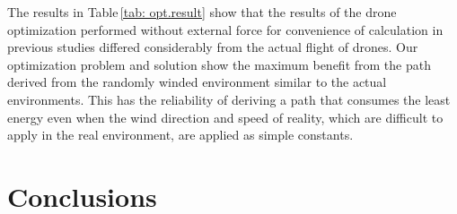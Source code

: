 \documentclass[journal]{./template/IEEEtran}
\begin{document}
\begin{table}[ht]
\caption{Comparison of the energy consumption between the baseline and the optimal path affected by wind effect in each case.}
\label{tab: opt.result}
\end{table}

The results in Table\,\ref{tab: opt.result} show that the results of the drone optimization performed without external force for convenience of calculation in previous studies differed considerably from the actual flight of drones.
Our optimization problem and solution show the maximum benefit from the path derived from the randomly winded environment similar to the actual environments. This has the reliability of deriving a path that consumes the least energy even when the wind direction and speed of reality, which are difficult to apply in the real environment, are applied as simple constants.












\section{Conclusions}
\end{document}
